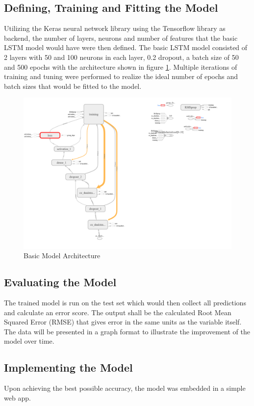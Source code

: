 \documentclass[10pt,11pt,12pt,oneside]{book}
\begin{document}
    \subsection{Defining, Training and Fitting the Model}
    Utilizing the Keras neural network library \cite{chollet2015keras} using the Tensorflow library \cite{tensorflow2015-whitepaper} as backend, the number of layers, neurons and number of features that the basic LSTM model would have were then defined. The basic LSTM model consisted of 2 layers with 50 and 100 neurons in each layer, 0.2 dropout, a batch size of 50 and 500 epochs with the architecture shown in figure \ref{fig:basic_arch}. Multiple iterations of training and tuning were performed to realize the ideal number of epochs and batch sizes that would be fitted to the model.
\begin{figure}[H]
\includegraphics[width=\linewidth]{basic_architecture.png}
\caption{Basic Model Architecture}
\label{fig:basic_arch}
\end{figure}
    \subsection{Evaluating the Model}
    The trained model is run on the test set which would then collect all predictions and calculate an error score. The output shall be the calculated Root Mean Squared Error (RMSE) that gives error in the same units as the variable itself. The data will be presented in a graph format to illustrate the improvement of the model over time.
    \subsection{Implementing the Model}
    Upon achieving the best possible accuracy, the model was embedded in a simple web app.
\end{document}

